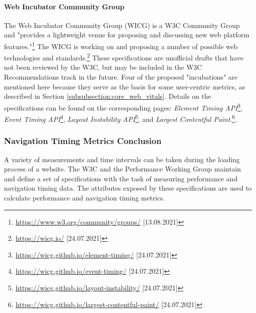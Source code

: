 
\paragraph{Web Incubator Community Group} %

The Web Incubator Community Group (WICG) is a W3C Community Group and "provides a lightweight venue for proposing and discussing new web platform features."\footnote{\url{https://www.w3.org/community/groups/} [13.08.2021]}
The WICG is working on and proposing a number of possible web technologies and standards.\footnote{\url{https://wicg.io/} [24.07.2021]}
These specifications are unofficial drafts that have not been reviewed by the W3C, but may be included in the W3C Recommendations track in the future.
Four of the proposed "incubations" are mentioned here because they serve as the basis for some user-centric metrics, as described in Section \ref{subsubsection:core_web_vitals}.
Details on the specifications can be found on the corresponding pages:
\textit{Element Timing API}\footnote{\url{https://wicg.github.io/element-timing/} [24.07.2021]}, 
\textit{Event Timing API}\footnote{\url{https://wicg.github.io/event-timing/} [24.07.2021]},
\textit{Layout Instability API}\footnote{\url{https://wicg.github.io/layout-instability/} [24.07.2021]}, and
\textit{Largest Contentful Paint}.\footnote{\url{https://wicg.github.io/largest-contentful-paint/} [24.07.2021]}.




\subsubsection{Navigation Timing Metrics Conclusion} %

A variety of measurements and time intervals can be taken during the loading process of a website.
The W3C and the Performance Working Group maintain and define a set of specifications with the task of measuring performance and navigation timing data.
The attributes exposed by these specifications are used to calculate performance and navigation timing metrics.

